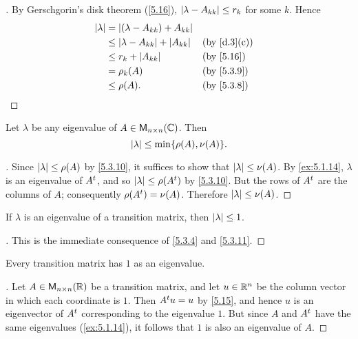 \begin{proof}[]
  By Gerschgorin's disk theorem (\cref{5.16}), \(\left\lvert\lambda - A_{k k}\right\rvert \leq r_k\) for some \(k\).
  Hence
  \begin{align*}
    \abs{\lambda} & = \abs{(\lambda - A_{k k}) + A_{k k}}                         \\
                  & \leq \abs{\lambda - A_{k k}} + \abs{A_{k k}} &  & \by{d.3}[c] \\
                  & \leq r_k + \abs{A_{k k}}                     &  & \by{5.16}   \\
                  & = \rho_k(A)                                  &  & \by{5.3.9}  \\
                  & \leq \rho(A).                                &  & \by{5.3.8}
  \end{align*}
\end{proof}

\begin{cor}\label{5.3.11}
  Let \(\lambda\) be any eigenvalue of \(A \in \ms[n][n][\C]\).
  Then
  \[
    \abs{\lambda} \leq \min\set{\rho(A), \nu(A)}.
  \]
\end{cor}

\begin{proof}[]
  Since \(\left\lvert\lambda\right\rvert \leq \rho(A)\) by \cref{5.3.10}, it suffices to show that \(\left\lvert\lambda\right\rvert \leq \nu(A)\).
  By \cref{ex:5.1.14}, \(\lambda\) is an eigenvalue of \({A}^{t}\), and so \(\left\lvert\lambda\right\rvert \leq \rho({A}^{t})\) by \cref{5.3.10}.
  But the rows of \({A}^{t}\) are the columns of \(A\);
  consequently \(\rho({A}^{t}) = \nu(A)\).
  Therefore \(\left\lvert\lambda\right\rvert \leq \nu(A)\).
\end{proof}

\begin{cor}\label{5.3.12}
  If \(\lambda\) is an eigenvalue of a transition matrix, then \(\left\lvert\lambda\right\rvert \leq 1\).
\end{cor}

\begin{proof}[]
  This is the immediate consequence of \cref{5.3.4} and \cref{5.3.11}.
\end{proof}

\begin{thm}\label{5.17}
  Every transition matrix has \(1\) as an eigenvalue.
\end{thm}

\begin{proof}[]
  Let \(A \in \ms[n][n][\R]\) be a transition matrix, and let \(u \in \mathbb{R}^n\) be the column vector in which each coordinate is \(1\).
  Then \({A}^{t} u = u\) by \cref{5.15}, and hence \(u\) is an eigenvector of \({A}^{t}\) corresponding to the eigenvalue \(1\).
  But since \(A\) and \({A}^{t}\) have the same eigenvalues (\cref{ex:5.1.14}), it follows that \(1\) is also an eigenvalue of \(A\).
\end{proof}

